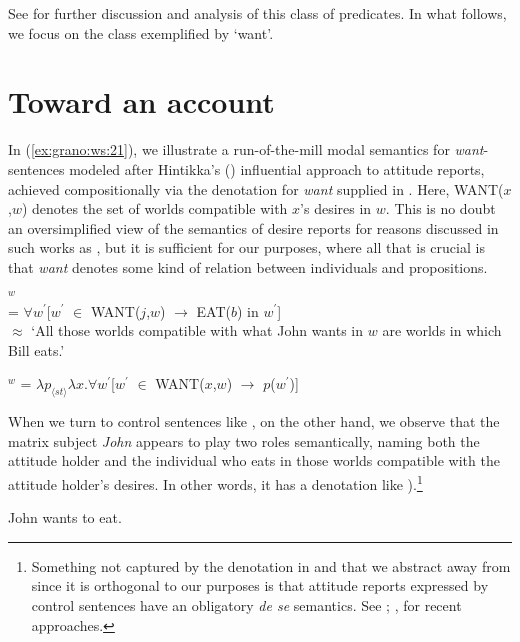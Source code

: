 \documentclass[output=paper,modfonts,nonflat]{langsci/langscibook}
\begin{document}
\noindent See \cite{GranoToappear} for further discussion and analysis of this class of predicates. In what follows, we focus on the class exemplified by `want'.



\section{Toward an account}
\label{sec:Grano:TowardAccount:4}

In  (\ref{ex:grano:ws:21}), we illustrate a run-of-the-mill modal semantics for \emph{want}-sentences modeled after Hintikka's (\citeyear{Hintikk1969}) influential approach to attitude reports, achieved compositionally via the denotation for \emph{want} supplied in . Here, WANT($x$,$w$) denotes the set of worlds compatible with $x$'s desires in $w$. This is no doubt an oversimplified view of the semantics of desire reports for reasons discussed in such works as \cite{Heim1992}, but it is sufficient for our purposes, where all that is crucial is that \emph{want} denotes some kind of relation between individuals and propositions.


\ea 
{}$^{w}$\\ = $\forall w^{\prime}$[$w^{\prime}$ $\in$ WANT($j$,$w$) $\rightarrow$ EAT($b$) in $w^{\prime}$]\\
$\approx$ `All those worlds compatible with what John wants in $w$ are worlds in which Bill eats.' \label{ex:grano:ws:21}
\z

\ea 
{}$^{w}$ = $\lambda p_{\langle st\rangle}\lambda x.\forall w^{\prime}$[$w^{\prime}$ $\in$ WANT($x$,$w$) $\rightarrow$ $p$($w^{\prime}$)] \label{ex:grano:w:22}
\z

When we turn to control sentences like , on the other hand, we observe that the matrix subject \emph{John} appears to play two roles semantically, naming both the attitude holder and the individual who eats in those worlds compatible with the attitude holder's desires. In other words, it has a denotation like ).\footnote{Something not captured by the denotation in  and that we abstract away from since it is orthogonal to our purposes is that attitude reports expressed by control sentences have an obligatory \emph{de se} semantics. See ; , \citeyear{Pearson2016} for recent approaches.}

\ea 
John wants to eat. \label{ex:grano:wcs2:23}
\z
\end{document}
